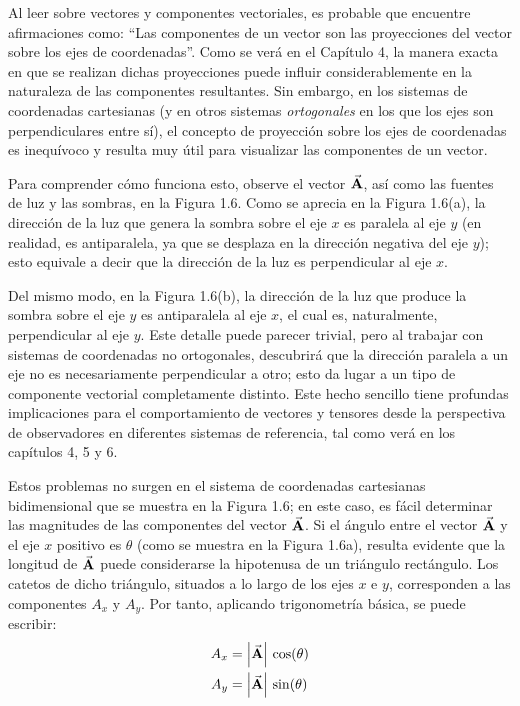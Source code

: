 \documentclass[hidelinks,12pt]{article}
\begin{document}
\par
Al leer sobre vectores y componentes vectoriales, es probable que encuentre afirmaciones como: \enquote{Las componentes de un vector son las proyecciones del vector sobre los ejes de coordenadas}. Como se verá en el Capítulo 4, la manera exacta en que se realizan dichas proyecciones puede influir considerablemente en la naturaleza de las componentes resultantes. Sin embargo, en los sistemas de coordenadas cartesianas (y en otros sistemas \textit{ortogonales} en los que los ejes son perpendiculares entre sí), el concepto de proyección sobre los ejes de coordenadas es inequívoco y resulta muy útil para visualizar las componentes de un vector.
\par
Para comprender cómo funciona esto, observe el vector $\va{A}$, así como las fuentes de luz y las sombras, en la Figura 1.6. Como se aprecia en la Figura 1.6(a), la dirección de la luz que genera la sombra sobre el eje $x$ es paralela al eje $y$ (en realidad, es antiparalela, ya que se desplaza en la dirección negativa del eje $y$); esto equivale a decir que la dirección de la luz es perpendicular al eje $x$.
\par
Del mismo modo, en la Figura 1.6(b), la dirección de la luz que produce la sombra sobre el eje $y$ es antiparalela al eje $x$, el cual es, naturalmente, perpendicular al eje $y$. Este detalle puede parecer trivial, pero al trabajar con sistemas de coordenadas no ortogonales, descubrirá que la dirección paralela a un eje no es necesariamente perpendicular a otro; esto da lugar a un tipo de componente vectorial completamente distinto. Este hecho sencillo tiene profundas implicaciones para el comportamiento de vectores y tensores desde la perspectiva de observadores en diferentes sistemas de referencia, tal como verá en los capítulos 4, 5 y 6.
\par
Estos problemas no surgen en el sistema de coordenadas cartesianas bidimensional que se muestra en la Figura 1.6; en este caso, es fácil determinar las magnitudes de las componentes del vector $\va{A}$. Si el ángulo entre el vector $\va{A}$ y el eje $x$ positivo es $\theta$ (como se muestra en la Figura 1.6a), resulta evidente que la longitud de $\va{A}$ puede considerarse la hipotenusa de un triángulo rectángulo. Los catetos de dicho triángulo, situados a lo largo de los ejes $x$ e $y$, corresponden a las componentes $A_{x}$ y $A_{y}$. Por tanto, aplicando trigonometría básica, se puede escribir:
\begin{align}
\begin{aligned}
    A_{x} &= \abs{\va{A}} \, \cos(\theta) \\
    A_{y} &= \abs{\va{A}} \, \sin(\theta)
\end{aligned}
\label{eq:eucacion_01_02}
\end{align}
\end{document}
